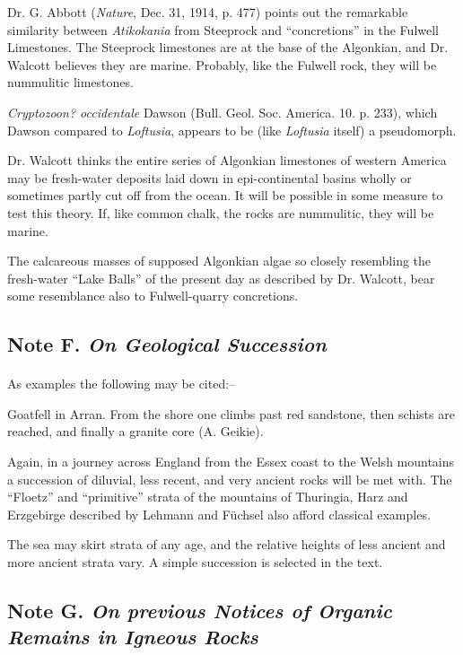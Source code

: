\documentclass[a4paper, 12pt, oneside, landscape]{article}
\begin{document}
Dr. G. Abbott (\emph{Nature}, Dec. 31, 1914, p. 477) points out the remarkable similarity between \emph{Atikokania} from Steeprock and ``concretions'' in the Fulwell Limestones. The Steeprock limestones are at the base of the Algonkian, and Dr. Walcott believes they are marine. Probably, like the Fulwell rock, they will be nummulitic limestones.

\emph{Cryptozoon? occidentale} Dawson (Bull. Geol. Soc. America. 10. p. 233), which Dawson compared to \emph{Loftusia}, appears to be (like \emph{Loftusia} itself) a pseudomorph.

Dr. Walcott thinks the entire series of Algonkian limestones of western America may be fresh-water deposits laid down in epi-continental basins wholly or sometimes partly cut off from the ocean. It will be possible in some measure to test this theory. If, like common chalk, the rocks are nummulitic, they will be marine.

The calcareous masses of supposed Algonkian algae so closely resembling the fresh-water ``Lake Balls'' of the present day as described by Dr. Walcott, bear some resemblance also to Fulwell-quarry concretions.

\subsection{Note F. \emph{On Geological Succession}}
\paragraph{}
As examples the following may be cited:--

Goatfell in Arran. From the shore one climbs past red sandstone, then schists are reached, and finally a granite core (A. Geikie).

Again, in a journey across England from the Essex coast to the Welsh mountains a succession of diluvial, less recent, and very ancient rocks will be met with. The ``Floetz'' and ``primitive'' strata of the mountains of Thuringia, Harz and Erzgebirge described by Lehmann and Füchsel also afford classical examples.

The sea may skirt strata of any age, and the relative heights of less ancient and more ancient strata vary. A simple succession is selected in the text.

\subsection{Note G. \emph{On previous Notices of Organic Remains in Igneous Rocks}}
\end{document}
